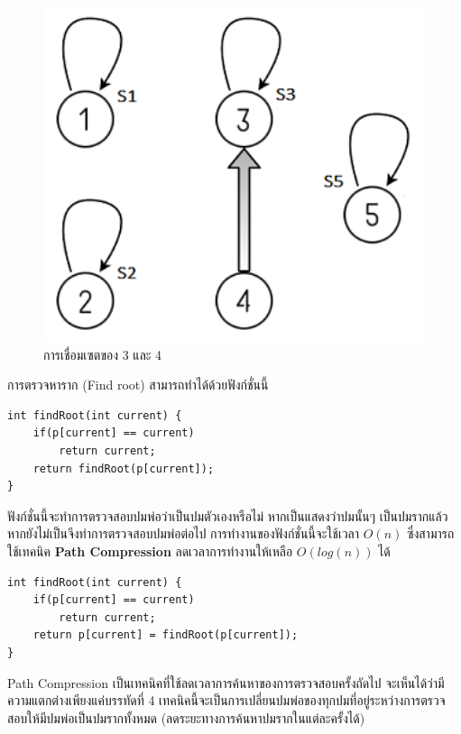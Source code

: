 \begin{figure}[h!]
    \centering
    \includegraphics[width=13cm]{images/union-find-3-4}
    \caption{การเชื่อมเซตของ 3 และ 4}
    \label{fig:union-find-3-4}
\end{figure}

การตรวจหาราก (Find root) สามารถทำได้ด้วยฟังก์ชั่นนี้
\begin{lstlisting}
int findRoot(int current) {
	if(p[current] == current)
    	return current;
    return findRoot(p[current]);
}
\end{lstlisting}
ฟังก์ชั่นนี้จะทำการตรวจสอบปมพ่อว่าเป็นปมตัวเองหรือไม่ หากเป็นแสดงว่าปมนั้นๆ เป็นปมรากแล้ว หากยังไม่เป็นจึงทำการตรวจสอบปมพ่อต่อไป การทำงานของฟังก์ชั่นนี้จะใช้เวลา $O(n)$ ซึ่งสามารถใช้เทคนิค \textbf{Path Compression} ลดเวลาการทำงานให้เหลือ $O(log(n))$ ได้

\begin{lstlisting}
int findRoot(int current) {
	if(p[current] == current)
    	return current;
    return p[current] = findRoot(p[current]);
}
\end{lstlisting}
Path Compression เป็นเทคนิคที่ใช้ลดเวลาการค้นหาของการตรวจสอบครั้งถัดไป จะเห็นได้ว่ามีความแตกต่างเพียงแค่บรรทัดที่ 4 เทคนิคนี้จะเป็นการเปลี่ยนปมพ่อของทุกปมที่อยู่ระหว่างการตรวจสอบให้มีปมพ่อเป็นปมรากทั้งหมด (ลดระยะทางการค้นหาปมรากในแต่ละครั้งได้)
